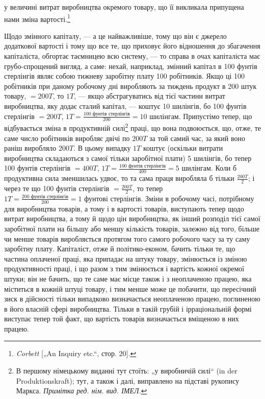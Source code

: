 \parcont{}  %
у величині витрат виробництва окремого товару, що її викликала припущена нами
зміна вартості.\footnote{
\emph{Corbett} [„An Inquiry etc.“, стор. 20].
}

Щодо змінного капіталу, — а це найважливіше, тому що він
є джерело додаткової вартості і тому що все те, що приховує
його відношення до збагачення капіталіста, обгортає таємницею
всю систему, — то справа в очах капіталіста має грубо-спрощений вигляд, а саме:
нехай, наприклад, змінний капітал в 100 фунтів стерлінгів являє собою тижневу
заробітну плату 100 робітників. Якщо ці 100 робітників при даному робочому дні
виробляють за тиждень продукт в 200 штук товару, $= 200 T$, то
$1 T$, — якщо абстрагуватись від тієї частини витрат виробництва,
яку додає сталий капітал, — коштує 10 шилінгів, бо 100 фунтів стерлінгів $= 200 T$,
$1 T = \frac{\text{100 фунтів стерлінгів}}{200} = 10\text{ шилінгам}$.
Припустімо тепер, що відбувається зміна в продуктивній силі\footnote*{
В першому німецькому виданні тут стоїть: „у виробничій силі“ (in der
Produktionskraft); тут, а також і далі, виправлено на підставі рукопису Маркса.
\emph{Примітка ред. нім. вид. ІМЕЛ.}
} праці,
що вона подвоюється, що, отже, те саме число робітників виробляє двічі по $200 T$ за той самий час, за
який воно раніш
виробляло $200 T$. В цьому випадку $1 T$ коштує (оскільки витрати виробництва складаються з самої тільки
заробітної плати)
5 шилінгів, бо тепер 100 фунтів стерлінгів $= 400 T$,
$1 T = \frac{\text{100 фунтів стерлінгів}}{400} = 5\text{ шилінгам}$.
Коли б продуктивна сила
зменшилась удвоє, то та сама праця виробляла б тільки $\frac{200 T}{2}$; і через те що 100 фунтів стерлінгів
$=\frac{200 T}{2}$, то тепер
$1 T = \frac{\text{200 фунтів стерлінгів}}{200} = 1\text{ фунтові стерлінгів}$. Зміни в робочому
часі, потрібному для виробництва товарів, а тому і в вартості
товарів, виступають тепер щодо витрат виробництва, а тому
й щодо цін виробництва, як інший розподіл тієї самої заробітної
плати на більшу або меншу кількість товарів, залежно від того,
більше чи менше товарів виробляється протягом того самого
робочого часу за ту саму заробітну плату. Капіталіст, отже
й політико-економ, бачить тільки те, що частина оплаченої праці,
яка припадає на штуку товару, змінюється із зміною продуктивності праці, і
що разом з тим змінюється і вартість кожної
окремої штуки; він не бачить, що те саме має місце також і з неоплаченою працею, яка міститься в
кожній штуці товару, і тим
менше може це побачити, що пересічний зиск в дійсності тільки
випадково визначається неоплаченою працею, поглиненою в його
власній сфері виробництва. Тільки в такій грубій і ірраціональній
формі виступає тепер той факт, що вартість товарів визначається вміщеною в них працею.
